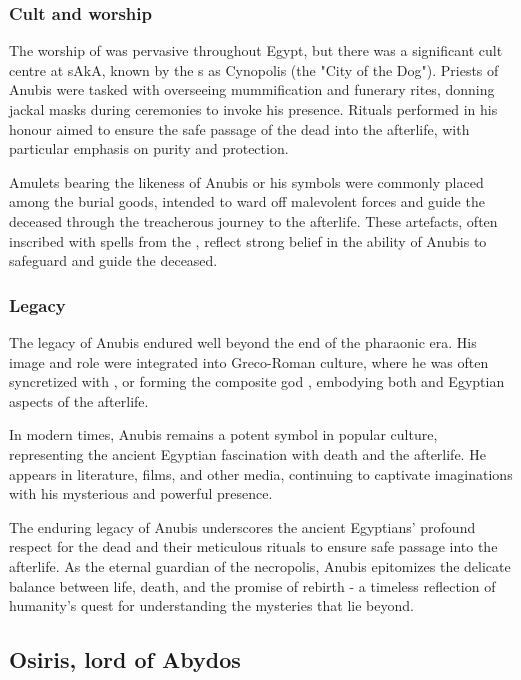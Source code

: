 \subsubsection*{Cult and worship}
The worship of  was pervasive throughout Egypt, but there was a significant cult centre at sAkA, known by the s as Cynopolis (the "City of the Dog"). Priests of Anubis were tasked with overseeing mummification and funerary rites, donning jackal masks during ceremonies to invoke his presence. Rituals performed in his honour aimed to ensure the safe passage of the dead into the afterlife, with particular emphasis on purity and protection.

Amulets bearing the likeness of Anubis or his symbols were commonly placed among the burial goods, intended to ward off malevolent forces and guide the deceased through the treacherous journey to the afterlife. These artefacts, often inscribed with spells from the , reflect strong belief in the ability of Anubis to safeguard and guide the deceased.

\subsubsection*{Legacy}
The legacy of Anubis endured well beyond the end of the pharaonic era. His image and role were integrated into Greco-Roman culture, where he was often syncretized with , or forming the composite god , embodying both  and Egyptian aspects of the afterlife.

In modern times, Anubis remains a potent symbol in popular culture, representing the ancient Egyptian fascination with death and the afterlife. He appears in literature, films, and other media, continuing to captivate imaginations with his mysterious and powerful presence.

The enduring legacy of Anubis underscores the ancient Egyptians' profound respect for the dead and their meticulous rituals to ensure safe passage into the afterlife. As the eternal guardian of the necropolis, Anubis epitomizes the delicate balance between life, death, and the promise of rebirth - a timeless reflection of humanity's quest for understanding the mysteries that lie beyond.

\subsection*{Osiris, lord of Abydos}

